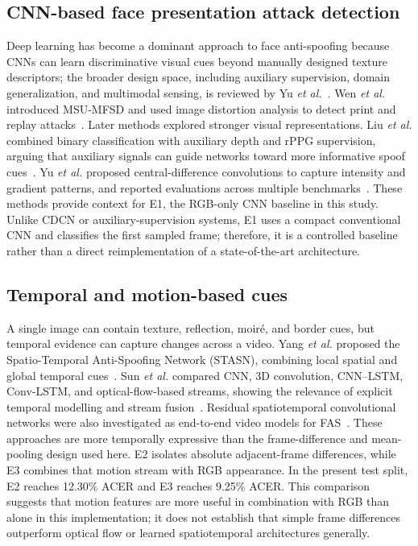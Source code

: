 \documentclass[a4paper,conference]{IEEEtran}
\begin{document}
\subsection{CNN-based face presentation attack detection}
Deep learning has become a dominant approach to face anti-spoofing because CNNs can learn discriminative visual cues beyond manually designed texture descriptors; the broader design space, including auxiliary supervision, domain generalization, and multimodal sensing, is reviewed by Yu \emph{et al.}~\cite{yu2023survey}. Wen \emph{et al.} introduced MSU-MFSD and used image distortion analysis to detect print and replay attacks~\cite{wen2015ida}. Later methods explored stronger visual representations. Liu \emph{et al.} combined binary classification with auxiliary depth and rPPG supervision, arguing that auxiliary signals can guide networks toward more informative spoof cues~\cite{liu2018aux}. Yu \emph{et al.} proposed central-difference convolutions to capture intensity and gradient patterns, and reported evaluations across multiple benchmarks~\cite{yu2020cdcn}. These methods provide context for E1, the RGB-only CNN baseline in this study. Unlike CDCN or auxiliary-supervision systems, E1 uses a compact conventional CNN and classifies the first sampled frame; therefore, it is a controlled baseline rather than a direct reimplementation of a state-of-the-art architecture.

\subsection{Temporal and motion-based cues}
A single image can contain texture, reflection, moir\'e, and border cues, but temporal evidence can capture changes across a video. Yang \emph{et al.} proposed the Spatio-Temporal Anti-Spoofing Network (STASN), combining local spatial and global temporal cues~\cite{yang2019stasn}. Sun \emph{et al.} compared CNN, 3D convolution, CNN--LSTM, Conv-LSTM, and optical-flow-based streams, showing the relevance of explicit temporal modelling and stream fusion~\cite{sun2018temporal}. Residual spatiotemporal convolutional networks were also investigated as end-to-end video models for FAS~\cite{silva2023spatiotemporal}. These approaches are more temporally expressive than the frame-difference and mean-pooling design used here. E2 isolates absolute adjacent-frame differences, while E3 combines that motion stream with RGB appearance. In the present test split, E2 reaches 12.30\% ACER and E3 reaches 9.25\% ACER. This comparison suggests that motion features are more useful in combination with RGB than alone in this implementation; it does not establish that simple frame differences outperform optical flow or learned spatiotemporal architectures generally.
\end{document}
